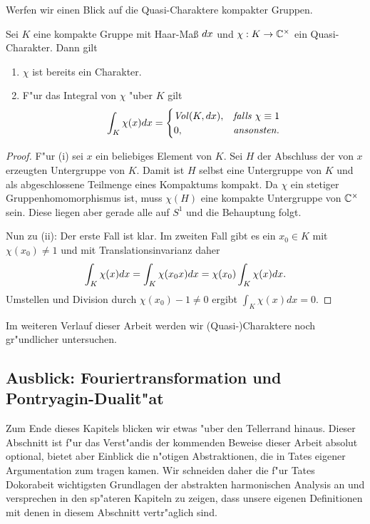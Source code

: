 	Werfen wir einen Blick auf die Quasi-Charaktere kompakter Gruppen.
	\begin{lemma}\label{Lemma:trivialerCharAufKompakt}
		Sei $K$ eine kompakte Gruppe mit Haar-Maß $d{x}$ und $\chi: K \to \mathbb{C}^\times$ ein Quasi-Charakter. Dann gilt
		\begin{enumerate}[label=\emph{(\roman*)}]
				\item $\chi$ ist bereits ein Charakter.
				\item F"ur das Integral von $\chi$ "uber $K$ gilt
					\begin{align*}
						\int_K \chi(x) d{x} = 
							\begin{cases}
								\text{\emph{Vol}}(K, d{x}),	& \text{\emph{falls} } \chi\equiv 1\\
								0,					& \text{\emph{ansonsten.}}
							\end{cases}
					\end{align*}
		\end{enumerate}
	\end{lemma}
	\begin{proof}
		F"ur (i) sei $x$ ein beliebiges Element von $K$. 
		Sei $H$ der Abschluss der von $x$ erzeugten Untergruppe von $K$.
		Damit ist $H$ selbst eine Untergruppe von $K$ und als abgeschlossene Teilmenge eines Kompaktums kompakt.
		Da $\chi$ ein stetiger Gruppenhomomorphismus ist, muss $\chi(H)$ eine kompakte Untergruppe von $\mathbb{C}^\times$ sein.
		Diese liegen aber gerade alle auf $S^1$ und die Behauptung folgt.
		
		Nun zu (ii): Der erste Fall ist klar. 
		Im zweiten Fall gibt es ein $x_0 \in K$ mit $\chi(x_0) \not=1$ und mit Translationsinvarianz daher
		\begin{align*}
			\int_K \chi(x)d{x} = \int_K\chi(x_0x)d{x} = \chi(x_0)\int_K\chi(x)d{x}.
		\end{align*}
		Umstellen und Division durch $\chi(x_0) - 1 \not=0$ ergibt $\int_K \chi(x)dx = 0$.
	\end{proof}
	Im weiteren Verlauf dieser Arbeit werden wir (Quasi-)Charaktere noch gr"undlicher untersuchen.
	
\subsection{Ausblick: Fouriertransformation und Pontryagin-Dualit"at}
	Zum Ende dieses Kapitels blicken wir etwas "uber den Tellerrand hinaus.
	Dieser Abschnitt ist f"ur das Verst"andis der kommenden Beweise dieser Arbeit absolut optional, bietet aber Einblick die n"otigen Abstraktionen, die in Tates eigener Argumentation zum tragen kamen.
	Wir schneiden daher die f"ur Tates Dokorabeit wichtigsten Grundlagen der abstrakten harmonischen Analysis an und versprechen in den sp"ateren Kapiteln zu zeigen, dass unsere eigenen Definitionen mit denen in diesem Abschnitt vertr"aglich sind.
	
